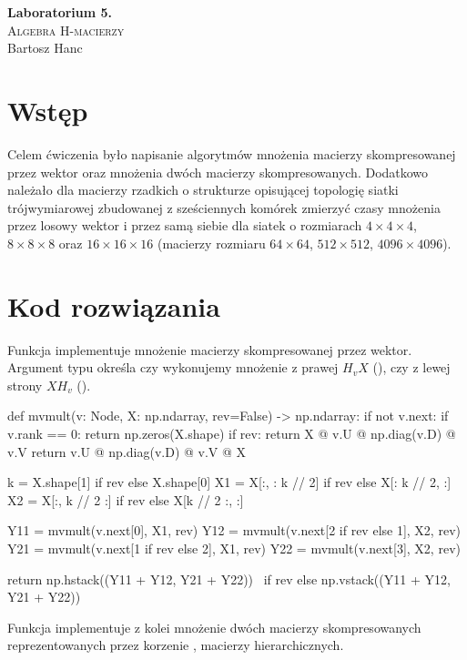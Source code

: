 \documentclass{../myclass}
\begin{document}
\begin{center}
    \Large \textbf{Laboratorium 5.}\\
    \large
    \textsc{Algebra H-macierzy}\\
    \normalsize
    Bartosz Hanc
\end{center}    

\section{Wstęp}

Celem ćwiczenia było napisanie algorytmów mnożenia macierzy skompresowanej przez wektor oraz
mnożenia dwóch macierzy skompresowanych. Dodatkowo należało dla macierzy rzadkich o strukturze
opisującej topologię siatki trójwymiarowej zbudowanej z sześciennych komórek zmierzyć czasy mnożenia
przez losowy wektor i przez samą siebie dla siatek o rozmiarach \(4\times 4\times 4\), \(8 \times 8
\times 8\) oraz \(16\times16\times16\) (macierzy rozmiaru \(64 \times64\), \(512\times 512\), \(4096
\times 4096\)).

\section{Kod rozwiązania}

Funkcja  implementuje mnożenie macierzy
skompresowanej przez wektor. Argument typu  określa czy wykonujemy mnożenie
z prawej \(H_vX\) (), czy z lewej strony \(XH_v\) ().

\begin{python}
def mvmult(v: Node, X: np.ndarray, rev=False) -> np.ndarray:
    if not v.next:
        if v.rank == 0:
            return np.zeros(X.shape)
        if rev:
            return X @ v.U @ np.diag(v.D) @ v.V
        return v.U @ np.diag(v.D) @ v.V @ X

    k = X.shape[1] if rev else X.shape[0]
    X1 = X[:, : k // 2] if rev else X[: k // 2, :]
    X2 = X[:, k // 2 :] if rev else X[k // 2 :, :]

    Y11 = mvmult(v.next[0], X1, rev)
    Y12 = mvmult(v.next[2 if rev else 1], X2, rev)
    Y21 = mvmult(v.next[1 if rev else 2], X1, rev)
    Y22 = mvmult(v.next[3], X2, rev)

    return np.hstack((Y11 + Y12, Y21 + Y22)) \ 
           if rev else np.vstack((Y11 + Y12, Y21 + Y22))
\end{python}
Funkcja  implementuje z kolei mnożenie dwóch macierzy
skompresowanych reprezentowanych przez korzenie \pythoninline{v: Node}, 
macierzy hierarchicznych.
\end{document}
